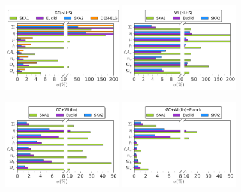 \begin{figure}[htbp]
\begin{centering}
\includegraphics[width=0.45\textwidth]{Chapters/linear-nonlinear-MG-forecasts/figures/BarPlots/4surveys-GCnlHS-MGDE-latetime}\hspace{-0.5pt}
\includegraphics[width=0.45\textwidth]{Chapters/linear-nonlinear-MG-forecasts/figures/BarPlots/4surveys-WLnlHS-MGDE-latetime.pdf}

\includegraphics[width=0.45\textwidth]{Chapters/linear-nonlinear-MG-forecasts/figures/BarPlots/4surveys-GC+WLlin-MGDE-latetime}\hspace{-0.5pt}
\includegraphics[width=0.45\textwidth]{Chapters/linear-nonlinear-MG-forecasts/figures/BarPlots/4surveys-GC+WLlin+Planck-MGDE-latetime}


\end{centering}
\end{figure}
